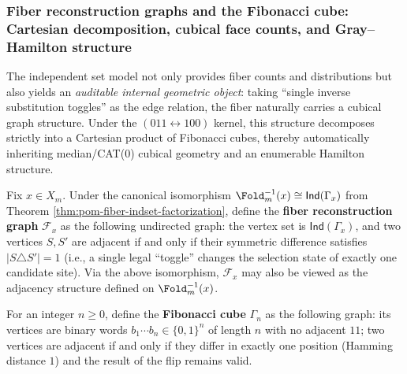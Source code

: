 \subsubsection{Fiber reconstruction graphs and the Fibonacci cube: Cartesian decomposition, cubical face counts, and Gray--Hamilton structure}\label{subsubsec:pom-fiber-reconstruction-cubical}

The independent set model not only provides fiber counts and distributions but also yields an \emph{auditable internal geometric object}:
taking ``single inverse substitution toggles'' as the edge relation, the fiber naturally carries a cubical graph structure.
Under the \((011\leftrightarrow 100)\) kernel, this structure decomposes strictly into a Cartesian product of Fibonacci cubes,
thereby automatically inheriting median/CAT(0) cubical geometry and an enumerable Hamilton structure.

\begin{definition}\label{def:pom-fiber-reconstruction-graph}
Fix \(x\in X_m\). Under the canonical isomorphism
\(\Fold_m^{-1}(x)\cong \mathsf{Ind}(\Gamma_x)\)
from Theorem \ref{thm:pom-fiber-indset-factorization}, define the \textbf{fiber reconstruction graph} \(\mathcal F_x\) as the following undirected graph:
the vertex set is \(\mathsf{Ind}(\Gamma_x)\), and two vertices \(S,S'\) are adjacent if and only if their symmetric difference satisfies
\(
|S\triangle S'|=1
\)
(i.e., a single legal ``toggle'' changes the selection state of exactly one candidate site).
Via the above isomorphism, \(\mathcal F_x\) may also be viewed as the adjacency structure defined on \(\Fold_m^{-1}(x)\).
\end{definition}

\begin{definition}\label{def:pom-fibonacci-cube}
For an integer \(n\ge 0\), define the \textbf{Fibonacci cube} \(\Gamma_n\) as the following graph:
its vertices are binary words \(b_1\cdots b_n\in\{0,1\}^n\) of length \(n\) with no adjacent \(11\);
two vertices are adjacent if and only if they differ in exactly one position (Hamming distance \(1\)) and the result of the flip remains valid.
\end{definition}

